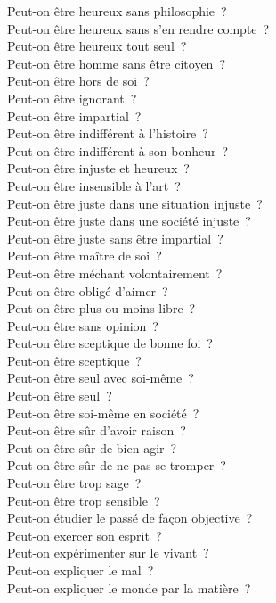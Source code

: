 \documentclass[a4paper,12pt]{article}
\begin{document}
Peut-on être heureux sans philosophie ? \\
Peut-on être heureux sans s'en rendre compte ? \\
Peut-on être heureux tout seul ? \\
Peut-on être homme sans être citoyen ? \\
Peut-on être hors de soi ? \\
Peut-on être ignorant ? \\
Peut-on être impartial ? \\
Peut-on être indifférent à l'histoire ? \\
Peut-on être indifférent à son bonheur ? \\
Peut-on être injuste et heureux ? \\
Peut-on être insensible à l'art ? \\
Peut-on être juste dans une situation injuste ? \\
Peut-on être juste dans une société injuste ? \\
Peut-on être juste sans être impartial ? \\
Peut-on être maître de soi ? \\
Peut-on être méchant volontairement ? \\
Peut-on être obligé d'aimer ? \\
Peut-on être plus ou moins libre ? \\
Peut-on être sans opinion ? \\
Peut-on être sceptique de bonne foi ? \\
Peut-on être sceptique ? \\
Peut-on être seul avec soi-même ? \\
Peut-on être seul ? \\
Peut-on être soi-même en société ? \\
Peut-on être sûr d'avoir raison ? \\
Peut-on être sûr de bien agir ? \\
Peut-on être sûr de ne pas se tromper ? \\
Peut-on être trop sage ? \\
Peut-on être trop sensible ? \\
Peut-on étudier le passé de façon objective ? \\
Peut-on exercer son esprit ? \\
Peut-on expérimenter sur le vivant ? \\
Peut-on expliquer le mal ? \\
Peut-on expliquer le monde par la matière ? \\
\end{document}
